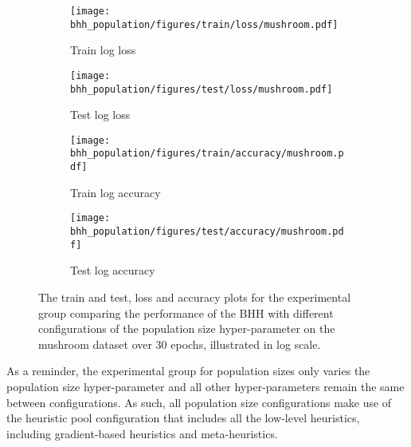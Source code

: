 \begin{figure}[htbp]
      \begin{subfigure}{0.5\textwidth}
            \centering
            \texttt{[image: bhh\_population/figures/train/loss/mushroom.pdf]}
            \caption{Train log loss}
            \label{fig:results:population:figures:loss:train:mushroom}
      \end{subfigure}
      \begin{subfigure}{0.5\textwidth}
            \centering
            \texttt{[image: bhh\_population/figures/test/loss/mushroom.pdf]}
            \caption{Test log loss}
            \label{fig:results:population:figures:loss:test:mushroom}
      \end{subfigure}
      \par\bigskip
      \begin{subfigure}{0.5\textwidth}
            \centering
            \texttt{[image: bhh\_population/figures/train/accuracy/mushroom.pdf]}
            \caption{Train log accuracy}
            \label{fig:results:population:figures:accuracy:train:mushroom}
      \end{subfigure}
      \begin{subfigure}{0.5\textwidth}
            \centering
            \texttt{[image: bhh\_population/figures/test/accuracy/mushroom.pdf]}
            \caption{Test log accuracy}
            \label{fig:results:population:figures:accuracy:test:mushroom}
      \end{subfigure}
      \par\bigskip
      \caption{The train and test, loss and accuracy plots for the experimental group comparing the performance of the \acs{BHH} with different configurations of the population size hyper-parameter on the mushroom dataset over 30 epochs, illustrated in log scale.}
      \label{fig:results:population:figures:mushroom}
\end{figure}

As a reminder, the experimental group for population sizes only varies the population size hyper-parameter and all other hyper-parameters remain the same between configurations. As such, all population size configurations make use of the heuristic pool configuration that includes all the low-level heuristics, including gradient-based heuristics and meta-heuristics.

